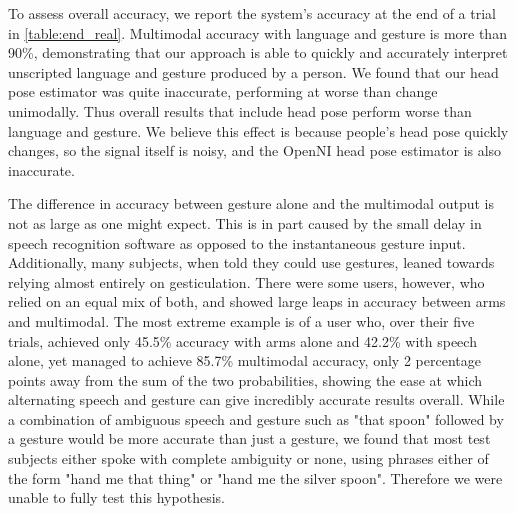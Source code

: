 \documentclass[letterpaper, 10 pt, conference]{ieeeconf}
\begin{document}
To assess overall accuracy, we report the system's accuracy at the end
of a trial in \ref{table:end_real}.  Multimodal accuracy with language
and gesture is more than 90\%, demonstrating that our approach is able
to quickly and accurately interpret unscripted language and gesture
produced by a person.  We found that our head pose estimator was quite
inaccurate, performing at worse than change unimodally.  Thus overall
results that include head pose perform worse than language and
gesture.  We believe this effect is because people's head pose quickly
changes, so the signal itself is noisy, and the OpenNI head pose
estimator is also inaccurate.

The difference in accuracy between gesture alone and the multimodal output is not as large as one might expect. This is in part caused by the small delay in speech recognition software as opposed to the instantaneous gesture input. Additionally, many subjects, when told they could use gestures, leaned towards relying almost entirely on gesticulation. There were some users, however, who relied on an equal mix of both, and showed large leaps in accuracy between arms and multimodal. The most extreme example is of a user who, over their five trials, achieved only 45.5\% accuracy with arms alone and 42.2\% with speech alone, yet managed to achieve 85.7\% multimodal accuracy, only 2 percentage points away from the sum of the two probabilities, showing the ease at which alternating speech and gesture can give incredibly accurate results overall. While a combination of ambiguous speech and gesture such as "that spoon" followed by a gesture would be more accurate than just a gesture, we found that most test subjects either spoke with complete ambiguity or none, using phrases either of the form "hand me that thing" or "hand me the silver spoon". Therefore we were unable to fully test this hypothesis.
\end{document}
